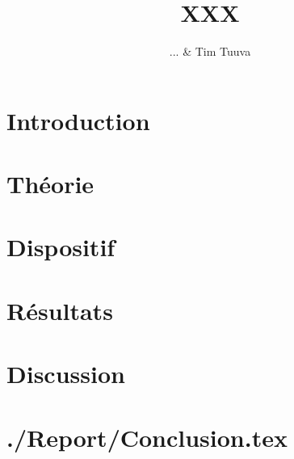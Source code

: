\documentclass[a4paper,12pt,oneside]{article}
\begin{document}
\title{XXX}%
\author{ ... \& Tim Tuuva}

\maketitle
\tableofcontents
\baselineskip=16pt
\parindent=15pt
\parskip=5pt

\begin{abstract}

\end{abstract}

\section{Introduction}


\section{Théorie}


\section{Dispositif}



\section{Résultats}


\section{Discussion}


\section{./Report/Conclusion.tex}



\cite{article}
\cite{book}

\medskip
 


\end{document}
